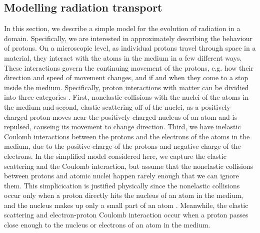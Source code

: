 \subsection{Modelling radiation transport}
In this section, we describe a simple model for the evolution of radiation in a domain. Specifically, we are interested in approximately describing the behaviour of protons. On a microscopic level, as individual protons travel through space in a material, they interact with the atoms in the medium in a few different ways. These interactions govern the continuing movement of the protons, e.g. how their direction and speed of movement changes, and if and when they come to a stop inside the medium. Specifically, proton interactions with matter can be dividied into three categories \cite{newhauser2015physics}. First, nonelastic collisions with the nuclei of the atoms in the medium and second, elastic scattering off of the nuclei, as a positively charged proton moves near the positively charged nucleus of an atom and is repulsed, causeing its movement to change direction. Third, we have inelastic Coulomb interactions between the protons and the electrons of the atoms in the medium, due to the positive charge of the protons and negative charge of the electrons. In the simplified model considered here, we capture the elastic scattering and the Coulomb interaction, but assume that the nonelastic collisions between protons and atomic nuclei happen rarely enough that we can ignore them. This simplicication is justified physically since the nonelastic collisions occur only when a proton directly hits the nucleus of an atom in the medium, and the nucleus makes up only a small part of an atom \cite{newhauser2015physics}. Meanwhile, the elastic scattering and electron-proton Coulomb interaction occur when a proton passes close enough to the nucleus or electrons of an atom in the medium. 

